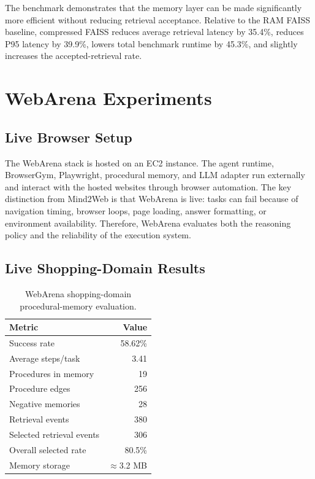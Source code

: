 \documentclass[11pt]{article}
\begin{document}
The benchmark demonstrates that the memory layer can be made significantly more efficient without reducing retrieval acceptance. Relative to the RAM FAISS baseline, compressed FAISS reduces average retrieval latency by 35.4\%, reduces P95 latency by 39.9\%, lowers total benchmark runtime by 45.3\%, and slightly increases the accepted-retrieval rate.

\section{WebArena Experiments}

\subsection{Live Browser Setup}

The WebArena stack is hosted on an EC2 instance. The agent runtime, BrowserGym, Playwright, procedural memory, and LLM adapter run externally and interact with the hosted websites through browser automation. The key distinction from Mind2Web is that WebArena is live: tasks can fail because of navigation timing, browser loops, page loading, answer formatting, or environment availability. Therefore, WebArena evaluates both the reasoning policy and the reliability of the execution system.

\subsection{Live Shopping-Domain Results}

\begin{table}[h]
\centering
\small
\begin{tabular}{lr}
\toprule
\textbf{Metric} & \textbf{Value} \\
\midrule
Success rate & 58.62\% \\
Average steps/task & 3.41 \\
Procedures in memory & 19 \\
Procedure edges & 256 \\
Negative memories & 28 \\
Retrieval events & 380 \\
Selected retrieval events & 306 \\
Overall selected rate & 80.5\% \\
Memory storage & $\approx$3.2 MB \\
\bottomrule
\end{tabular}
\caption{WebArena shopping-domain procedural-memory evaluation.}
\label{tab:webarena_best}
\end{table}
\end{document}
